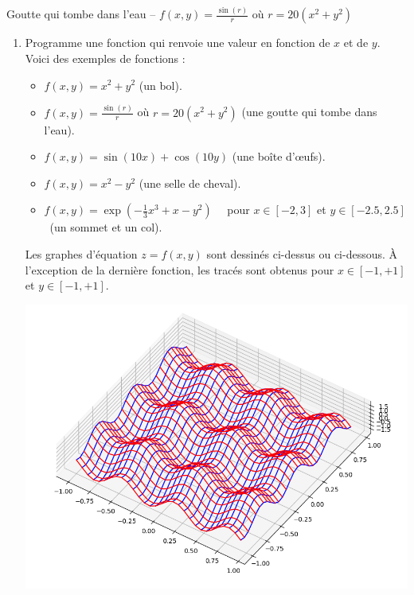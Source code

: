 \documentclass[11pt,class=report,crop=false]{standalone}
\begin{document}
\begin{activite}[Surfaces]
\begin{center}
\begin{minipage}{0.4\textwidth}
\begin{center}
			Goutte qui tombe dans l'eau -- $f(x,y) = \frac{\sin(r)}{r}$ où
			$r = 20(x^2+y^2)$
		\end{center}
	\end{minipage}
\end{center}

\begin{enumerate}
	
	\item Programme une fonction  qui renvoie une valeur en fonction de $x$ et de $y$.
	Voici des exemples de fonctions :
	\begin{itemize}
		\item  $f(x,y) = x^2+y^2$ \quad (un bol).
		\item $f(x,y) = \frac{\sin(r)}{r}$ où $r = 20(x^2+y^2)$ \quad  (une goutte qui tombe dans l'eau).
		\item $f(x,y) = \sin(10x)+\cos(10y)$ \quad (une boîte d'\oe ufs).
		\item $f(x,y) = x^2-y^2$ \quad (une selle de cheval).
		\item $f(x,y) = \exp(-\frac13x^3+x-y^2)$ \ \  pour $x \in [-2,3]$ et $y \in [-2.5,2.5]$ \  (un sommet et un col).
	\end{itemize}
	Les graphes d'équation $z=f(x,y)$ sont dessinés ci-dessus ou ci-dessous. \`A l'exception de la dernière fonction, les tracés sont obtenus pour $x \in[-1,+1]$ et $y \in [-1,+1]$.

\begin{center}
	\begin{minipage}{0.3\textwidth}
		\begin{center}
			\includegraphics[scale=\myscale,scale=0.2]{ecran-surface-3}
			

\end{center}
\end{minipage}
\end{center}
\end{enumerate}
\end{activite}
\end{document}
